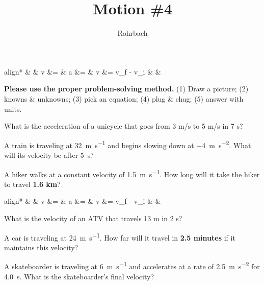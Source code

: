 \documentclass[10pt]{exam}
\title{Motion \#4}
\author{Rohrbach}
\newcommand{\printeqs}{
  \begin{center}
    \vspace{-1cm}
    \begin{empheq}[box=\fbox]{align*}
     &
     & 
      v &= \frac{d}{t}        &    
      a &= \frac{\Delta v}{t} &
      \Delta v &= v_f - v_i   &
     &
    \end{empheq}
  \end{center}
}
\begin{document}
\maketitle

\printeqs

\noindent
{\bf Please use the proper problem-solving method.}  (1) Draw a picture; (2) knowns \& unknowns; (3) pick an equation; (4) plug \& chug; (5) answer with units.


\begin{questions}


\question
  What is the acceleration of a unicycle that goes from 
  3 m/s to 5 m/s in 7 s?
  \vs

\question 
  A train is traveling at \SI{32}{\meter\per\second} and begins slowing down at \SI{-4}{\meter\per\second^2}. What will its velocity be after \SI{5}{\second}? 
  \vs

\question
  A hiker walks at a constant velocity of \SI{1.5}{\meter\per\second}. How long will it take the hiker to travel {\bf 1.6 km}? 
  \vs

\pagebreak

\printeqs

\question
  What is the velocity of an ATV that travels 13 m in 2 s?
  \vs

\question
  A car is traveling at \SI{24}{\meter\per\second}. How far will it travel in {\bf 2.5 minutes} if it maintains this velocity?
  \vs

\question
  A skateboarder is traveling at \SI{6}{\meter\per\second} and accelerates at a rate of \SI{2.5}{\meter\per\second^2} for \SI{4.0}{\second}. What is the skateboarder's final velocity?
  \vs

  
\end{questions}
\end{document}
